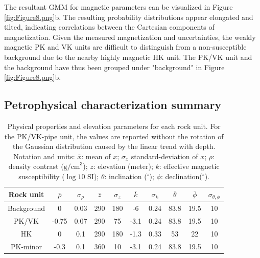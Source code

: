 \documentclass[paper, twocolumn]{geophysics} %
\begin{document}
The resultant GMM for magnetic parameters can be visualized in Figure \ref{fig:Figure8.png}b. The resulting probability distributions appear elongated and tilted, indicating correlations between the Cartesian components of magnetization. Given the measured magnetization and uncertainties, the weakly magnetic PK and VK units are difficult to distinguish from a non-susceptible background due to the nearby highly magnetic HK unit. The PK/VK unit and the background have thus been grouped under "background" in Figure \ref{fig:Figure8.png}b.


\subsection{Petrophysical characterization summary}

\begin{table}
\centering
\label{tbl:gmmtable}
\caption{Physical properties and elevation parameters for each rock unit. For the PK/VK-pipe unit, the values are reported without the rotation of the Gaussian distribution caused by the linear trend with depth. Notation and units: $\bar{x}$: mean of $x$; $\sigma_x$ standard-deviation of $x$; $\rho$: density contrast ($\text{g/cm}^3$); $z$: elevation (meter); $k$: effective magnetic susceptibility ($\log10$ SI); $\theta$: inclination ($^{\circ}$); $\phi$: declination($^{\circ}$).}
\begin{tabular}{|c|c|c|c|c|c|c|c|c|c|}
\hline
Rock unit & $\bar{\rho}$ & $\sigma_\rho$ & $\bar{z}$ & $\sigma_z$ & $\bar{k}$ & $\sigma_k$ & $\bar{\theta}$ & $\bar{\phi}$ & $\sigma_{\theta, \phi}$\\
\hline
Background & 0 & 0.03 & 290 & 180 & -6 & 0.24 & 83.8 & 19.5 & 10 \\
\hline
PK/VK & -0.75 & 0.07 & 290 & 75 &-3.1 & 0.24 & 83.8 & 19.5 & 10\\
\hline
HK & 0 & 0.1 & 290 & 180 & -1.3 & 0.33 & 53 & 22 & 10 \\
\hline
PK-minor & -0.3 & 0.1 & 360 & 10 & -3.1 & 0.24 & 83.8 & 19.5 & 10\\
\hline
\end{tabular}
\end{table}
\end{document}
